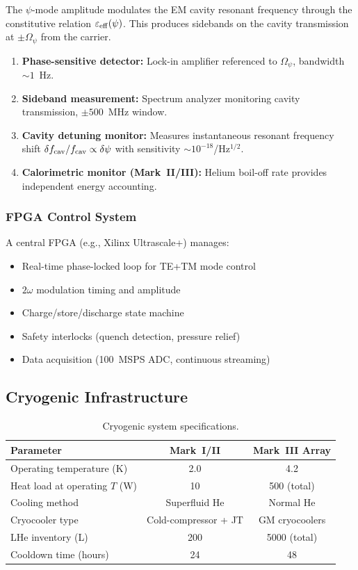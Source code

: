 \documentclass[11pt,a4paper]{article}
\begin{document}
The $\psi$-mode amplitude modulates the EM cavity resonant frequency
through the constitutive relation $\varepsilon_{\rm eff}(\psi)$.  This
produces sidebands on the cavity transmission at $\pm\Omega_\psi$ from
the carrier.

\begin{enumerate}
\item \textbf{Phase-sensitive detector:} Lock-in amplifier referenced to
$\Omega_\psi$, bandwidth $\sim 1$~Hz.

\item \textbf{Sideband measurement:} Spectrum analyzer monitoring cavity
transmission, $\pm 500$~MHz window.

\item \textbf{Cavity detuning monitor:} Measures instantaneous resonant
frequency shift $\delta f_{\rm cav}/f_{\rm cav} \propto \delta\psi$ with
sensitivity $\sim 10^{-18}$/Hz$^{1/2}$.

\item \textbf{Calorimetric monitor (Mark~II/III):} Helium boil-off
rate provides independent energy accounting.
\end{enumerate}

\subsubsection{FPGA Control System}

A central FPGA (e.g., Xilinx Ultrascale+) manages:
\begin{itemize}
\item Real-time phase-locked loop for TE+TM mode control
\item $2\omega$ modulation timing and amplitude
\item Charge/store/discharge state machine
\item Safety interlocks (quench detection, pressure relief)
\item Data acquisition (100~MSPS ADC, continuous streaming)
\end{itemize}

\subsection{Cryogenic Infrastructure}

\begin{table}[h]
\centering
\caption{Cryogenic system specifications.}
\label{tab:cryo}
\begin{tabular}{@{}lcc@{}}
\toprule
Parameter & Mark~I/II & Mark~III Array \\
\midrule
Operating temperature (K) & 2.0 & 4.2 \\
Heat load at operating $T$ (W) & 10 & 500 (total) \\
Cooling method & Superfluid He & Normal He \\
Cryocooler type & Cold-compressor + JT & GM cryocoolers \\
LHe inventory (L) & 200 & 5000 (total) \\
Cooldown time (hours) & 24 & 48 \\
\bottomrule
\end{tabular}
\end{table}
\end{document}
